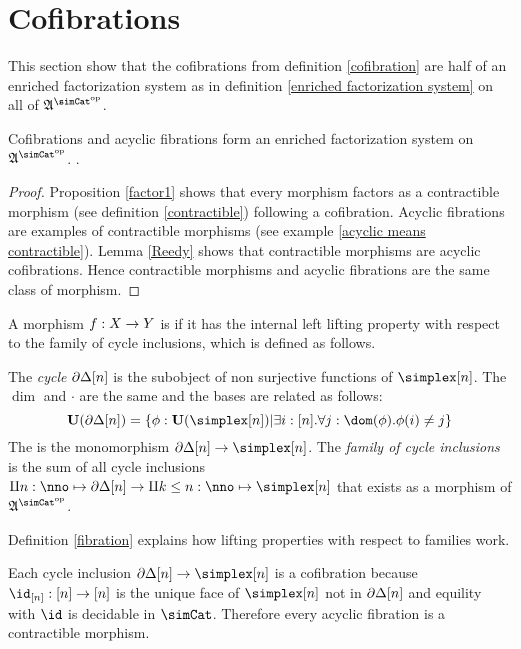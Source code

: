 \documentclass[csh.tex]{subfiles}
\begin{document}
\section{Cofibrations}
This section show that the cofibrations from definition \ref{cofibration} are half of an enriched factorization system as in definition \ref{enriched factorization system} on all of $\ambient\s$.

\begin{lemma} Cofibrations and acyclic fibrations form an enriched factorization system on $\ambient\s$. \label{factorization system 1}. \end{lemma}

\begin{proof} Proposition \ref{factor1} shows that every morphism factors as a contractible morphism (see definition \ref{contractible}) following a cofibration. Acyclic fibrations are examples of contractible morphisms (see example \ref{acyclic means contractible}). Lemma \ref{Reedy} shows that contractible morphisms are acyclic cofibrations. Hence contractible morphisms and acyclic fibrations are the same class of morphism.
\end{proof}

\begin{definition} A morphism $f: X\to Y$ is  if it has the internal left lifting property with respect to the family of cycle inclusions, which is defined as follows.

The \emph{cycle} $\partial\Delta[n]$ is the subobject of non surjective functions of $\simplex[n]$. The $\dim$ and $\cdot$ are the same and the bases are related as follows:
\[ \base(\cycle[n]) = \set{\phi\of\base(\simplex[n])| \exists i\of[n].\forall j\of \dom(\phi).\phi(i)\neq j } \]
The  is the monomorphism $\cycle[n]\to\simplex[n]$. The \emph{family of cycle inclusions} is the sum of all cycle inclusions $\coproduct{n\of\nno}{\cycle[n]}\to \coproduct{k\leq n\of\nno}{\simplex[n]}$ that exists as a morphism of $\ambient\s$.

Definition \ref{fibration} explains how lifting properties with respect to families work.
\end{definition}

\begin{example} Each cycle inclusion $\cycle[n]\to\simplex[n]$ is a cofibration because $\id_{[n]}\of[n]\to[n]$ is the unique face of $\simplex[n]$ not in $\partial\Delta[n]$ and equility with $\id$ is decidable in $\simCat$. Therefore every acyclic fibration is a contractible morphism. \label{acyclic means contractible}\end{example}
\end{document}
